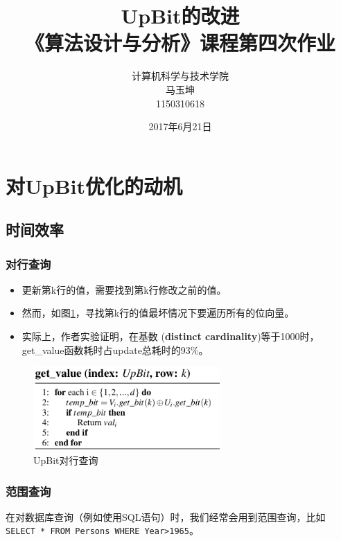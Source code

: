 \documentclass[11pt, a4paper]{article}
\begin{document}
\title{{\bf\Huge UpBit的改进} \\[2ex]{\huge 《算法设计与分析》课程第四次作业}}
\author{计算机科学与技术学院\\马玉坤\\1150310618}
\date{2017年6月21日}
\maketitle

\section{对UpBit优化的动机}
\subsection{时间效率}
\subsubsection{对行查询}
\begin{itemize}
\item 更新第k行的值，需要找到第k行修改之前的值。
\item 然而，如图\ref{fig:get_value}，寻找第k行的值最坏情况下要遍历所有的位向量。
\item 实际上，作者实验证明，在基数 ({\bf distinct cardinality})等于1000时，get\_value函数耗时占update总耗时的93\%。
\end{itemize}
\begin{figure}[H]
  \begin{center}
    \includegraphics[width=2.8in]{get_value.png}
    \caption{UpBit对行查询}\label{fig:get_value}
  \end{center}
\end{figure}


\subsubsection{范围查询}
  在对数据库查询（例如使用SQL语句）时，我们经常会用到范围查询，比如\\\texttt{SELECT * FROM Persons WHERE Year>1965}。
\end{document}
